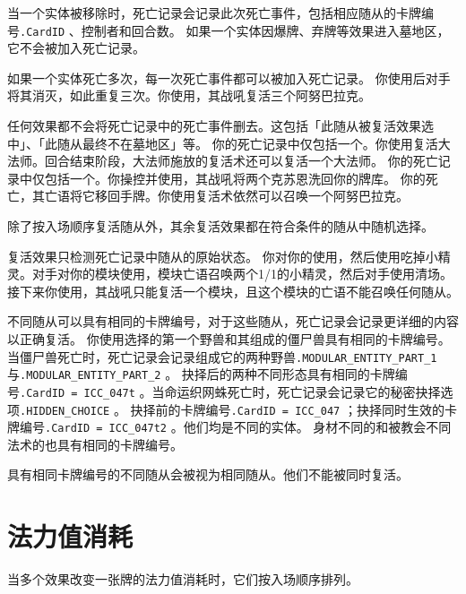 当一个实体被移除时，死亡记录会记录此次死亡事件，包括相应随从的卡牌编号\texttt{.CardID} 、控制者和回合数。
\notice 如果一个实体因爆牌、弃牌等效果进入墓地区，它不会被加入死亡记录。

如果一个实体死亡多次，每一次死亡事件都可以被加入死亡记录。
\example 你使用后对手将其消灭，如此重复三次。你使用，其战吼复活三个阿努巴拉克。

任何效果都不会将死亡记录中的死亡事件删去。这包括「此随从被复活效果选中」、「此随从最终不在墓地区」等。
\example 你的死亡记录中仅包括一个。你使用复活大法师。回合结束阶段，大法师施放的复活术还可以复活一个大法师。
\example 你的死亡记录中仅包括一个。你操控并使用，其战吼将两个克苏恩洗回你的牌库。
\example {} 你的死亡，其亡语将它移回手牌。你使用复活术依然可以召唤一个阿努巴拉克。

除了按入场顺序复活随从外，其余复活效果都在符合条件的随从中随机选择。

复活效果只检测死亡记录中随从的原始状态。
\example 你对你的使用，然后使用吃掉小精灵。对手对你的模块使用，模块亡语召唤两个1/1的小精灵，然后对手使用清场。接下来你使用，其战吼只能复活一个模块，且这个模块的亡语不能召唤任何随从。

不同随从可以具有相同的卡牌编号，对于这些随从，死亡记录会记录更详细的内容以正确复活。
\example 你使用选择的第一个野兽和其组成的僵尸兽具有相同的卡牌编号。当僵尸兽死亡时，死亡记录会记录组成它的两种野兽\texttt{.MODULAR\_ENTITY\_PART\_1}与\texttt{.MODU\-LAR\_ENTITY\_PART\_2} 。
\example {}抉择后的两种不同形态具有相同的卡牌编号\texttt{.CardID = ICC\_047t} 。当命运织网蛛死亡时，死亡记录会记录它的秘密抉择选项\texttt{.HIDDEN\_CHOICE} 。
\notice 抉择前的卡牌编号\texttt{.CardID = ICC\_047} ；抉择同时生效的卡牌编号\texttt{.CardID = ICC\_047t2} 。他们均是不同的实体。
\example 身材不同的和被教会不同法术的也具有相同的卡牌编号。

具有相同卡牌编号的不同随从会被视为相同随从。他们不能被同时复活。

\section{法力值消耗}
\label{cost}

当多个效果改变一张牌的法力值消耗时，它们按入场顺序排列。

